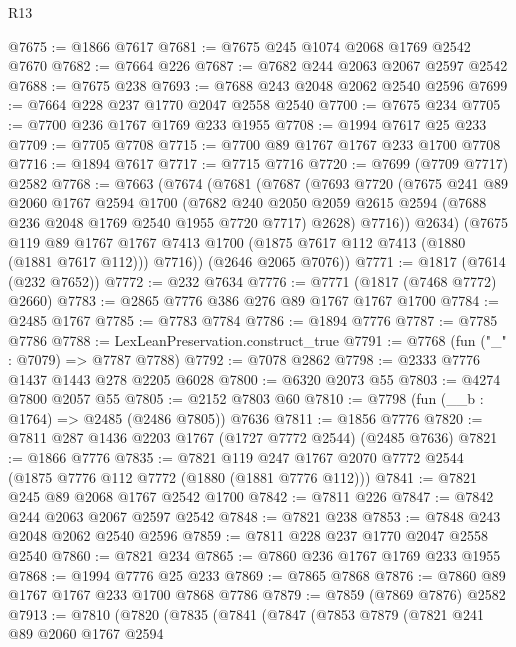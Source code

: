\begin{lexlean}{R13}
\begin{coremodule}
@7675 := @1866 @7617
@7681 := @7675 @245 @1074 @2068 @1769 @2542 @7670
@7682 := @7664 @226
@7687 := @7682 @244 @2063 @2067 @2597 @2542
@7688 := @7675 @238
@7693 := @7688 @243 @2048 @2062 @2540 @2596
@7699 := @7664 @228 @237 @1770 @2047 @2558 @2540
@7700 := @7675 @234
@7705 := @7700 @236 @1767 @1769 @233 @1955
@7708 := @1994 @7617 @25 @233
@7709 := @7705 @7708
@7715 := @7700 @89 @1767 @1767 @233 @1700 @7708
@7716 := @1894 @7617
@7717 := @7715 @7716
@7720 := @7699 (@7709 @7717) @2582
@7768 := @7663
    (@7674
      (@7681
        (@7687
          (@7693
            @7720
            (@7675
              @241
              @89
              @2060
              @1767
              @2594
              @1700
              (@7682
                @240
                @2050
                @2059
                @2615
                @2594
                (@7688 @236 @2048 @1769 @2540 @1955 @7720 @7717)
                @2628)
              @7716))
          @2634)
        (@7675
          @119
          @89
          @1767
          @1767
          @7413
          @1700
          (@1875 @7617 @112 @7413 (@1880 (@1881 @7617 @112)))
          @7716))
      (@2646 @2065 @7076))
@7771 := @1817 (@7614 (@232 @7652))
@7772 := @232 @7634
@7776 := @7771 (@1817 (@7468 @7772) @2660)
@7783 := @2865 @7776 @386 @276 @89 @1767 @1767 @1700
@7784 := @2485 @1767
@7785 := @7783 @7784
@7786 := @1894 @7776
@7787 := @7785 @7786
@7788 := LexLeanPreservation.construct_true
@7791 := @7768 (fun ("_" : @7079) => @7787 @7788)
@7792 := @7078 @2862
@7798 := @2333 @7776 @1437 @1443 @278 @2205 @6028
@7800 := @6320 @2073 @55
@7803 := @4274 @7800 @2057 @55
@7805 := @2152 @7803 @60
@7810 := @7798 (fun (__b : @1764) => @2485 (@2486 @7805)) @7636
@7811 := @1856 @7776
@7820 := @7811 @287 @1436 @2203 @1767 (@1727 @7772 @2544) (@2485 @7636)
@7821 := @1866 @7776
@7835 := @7821 @119 @247 @1767 @2070 @7772 @2544 (@1875 @7776 @112 @7772 (@1880 (@1881 @7776 @112)))
@7841 := @7821 @245 @89 @2068 @1767 @2542 @1700
@7842 := @7811 @226
@7847 := @7842 @244 @2063 @2067 @2597 @2542
@7848 := @7821 @238
@7853 := @7848 @243 @2048 @2062 @2540 @2596
@7859 := @7811 @228 @237 @1770 @2047 @2558 @2540
@7860 := @7821 @234
@7865 := @7860 @236 @1767 @1769 @233 @1955
@7868 := @1994 @7776 @25 @233
@7869 := @7865 @7868
@7876 := @7860 @89 @1767 @1767 @233 @1700 @7868 @7786
@7879 := @7859 (@7869 @7876) @2582
@7913 := @7810
    (@7820
      (@7835
        (@7841
          (@7847
            (@7853
              @7879
              (@7821
                @241
                @89
                @2060
                @1767
                @2594

\end{coremodule}
\end{lexlean}
